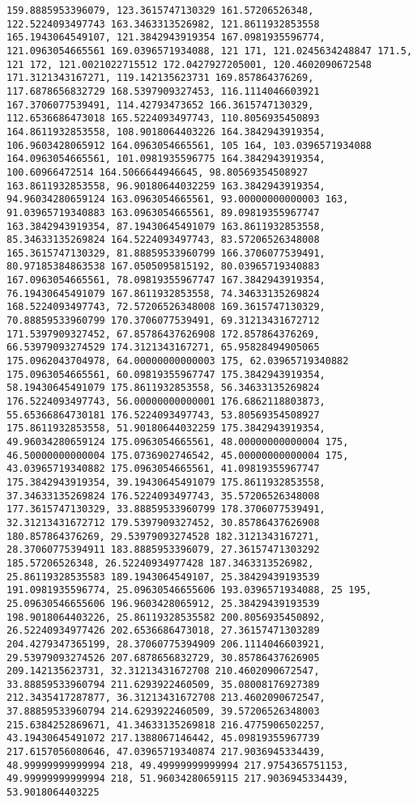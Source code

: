 \documentclass{article}
\begin{document}
\begin{Verbatim}[commandchars=\\\{\}]
159.8885953396079, 123.3615747130329 161.57206526348, 122.5224093497743 163.3463313526982, 121.8611932853558 165.1943064549107, 121.3842943919354 167.0981935596774, 121.0963054665561 169.0396571934088, 121 171, 121.0245634248847 171.5, 121 172, 121.0021022715512 172.0427927205001, 120.4602090672548 171.3121343167271, 119.142135623731 169.857864376269, 117.6878656832729 168.5397909327453, 116.1114046603921 167.3706077539491, 114.42793473652 166.3615747130329, 112.6536686473018 165.5224093497743, 110.8056935450893 164.8611932853558, 108.9018064403226 164.3842943919354, 106.9603428065912 164.0963054665561, 105 164, 103.0396571934088 164.0963054665561, 101.0981935596775 164.3842943919354, 100.60966472514 164.5066644946645, 98.80569354508927 163.8611932853558, 96.90180644032259 163.3842943919354, 94.96034280659124 163.0963054665561, 93.00000000000003 163, 91.03965719340883 163.0963054665561, 89.09819355967747 163.3842943919354, 87.19430645491079 163.8611932853558, 85.34633135269824 164.5224093497743, 83.57206526348008 165.3615747130329, 81.88859533960799 166.3706077539491, 80.97185384863538 167.0505095815192, 80.03965719340883 167.0963054665561, 78.09819355967747 167.3842943919354, 76.19430645491079 167.8611932853558, 74.34633135269824 168.5224093497743, 72.57206526348008 169.3615747130329, 70.88859533960799 170.3706077539491, 69.31213431672712 171.5397909327452, 67.85786437626908 172.857864376269, 66.53979093274529 174.3121343167271, 65.95828494905065 175.0962043704978, 64.00000000000003 175, 62.03965719340882 175.0963054665561, 60.09819355967747 175.3842943919354, 58.19430645491079 175.8611932853558, 56.34633135269824 176.5224093497743, 56.00000000000001 176.6862118803873, 55.65366864730181 176.5224093497743, 53.80569354508927 175.8611932853558, 51.90180644032259 175.3842943919354, 49.96034280659124 175.0963054665561, 48.00000000000004 175, 46.50000000000004 175.0736902746542, 45.00000000000004 175, 43.03965719340882 175.0963054665561, 41.09819355967747 175.3842943919354, 39.19430645491079 175.8611932853558, 37.34633135269824 176.5224093497743, 35.57206526348008 177.3615747130329, 33.88859533960799 178.3706077539491, 32.31213431672712 179.5397909327452, 30.85786437626908 180.857864376269, 29.53979093274528 182.3121343167271, 28.37060775394911 183.8885953396079, 27.36157471303292 185.57206526348, 26.52240934977428 187.3463313526982, 25.86119328535583 189.1943064549107, 25.38429439193539 191.0981935596774, 25.09630546655606 193.0396571934088, 25 195, 25.09630546655606 196.9603428065912, 25.38429439193539 198.9018064403226, 25.86119328535582 200.8056935450892, 26.52240934977426 202.6536686473018, 27.36157471303289 204.4279347365199, 28.37060775394909 206.1114046603921, 29.53979093274526 207.6878656832729, 30.85786437626905 209.142135623731, 32.31213431672708 210.4602090672547, 33.88859533960794 211.6293922460509, 35.08008176927389 212.3435417287877, 36.31213431672708 213.4602090672547, 37.88859533960794 214.6293922460509, 39.57206526348003 215.6384252869671, 41.34633135269818 216.4775906502257, 43.19430645491072 217.1388067146442, 45.09819355967739 217.6157056080646, 47.03965719340874 217.9036945334439, 48.99999999999994 218, 49.49999999999994 217.9754365751153, 49.99999999999994 218, 51.96034280659115 217.9036945334439, 53.9018064403225 
\end{Verbatim}
\end{document}
